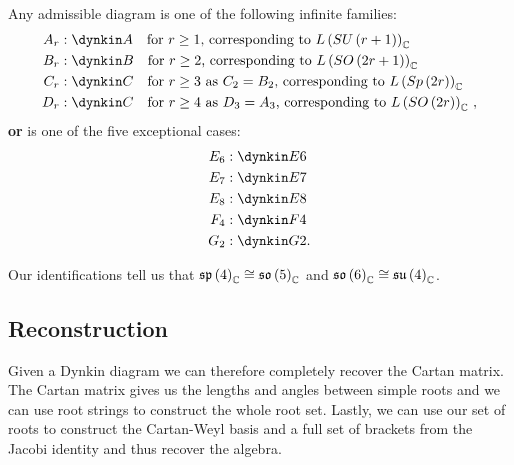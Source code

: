 \begin{theorem}
    Any admissible diagram is one of the following infinite families:
    \begin{align}
        A_r &: \dynkin A{} \quad \text{for $r \geq 1$, corresponding to $L \left( SU \left( r + 1 \right)  \right)_{\C}$} \\
        B_r &: \dynkin B{} \quad \text{for $r \geq 2$, corresponding to $L \left( SO \left( 2r + 1 \right)  \right)_{\C}$} \\
        C_r &: \dynkin C{}\quad \text{for $r \geq 3$ as $C_2 = B_2$, corresponding to $L \left( Sp \left( 2r  \right)  \right)_{\C}$ } \\
        D_r &: \dynkin C{}\quad \text{for $r \geq 4$ as $D_3 = A_3$, corresponding to $L \left( SO \left( 2r  \right)  \right)_{\C}$  }
    ,\end{align}
    \textbf{or} is one of the five exceptional cases: 
    \begin{align}
        E_6 &: \dynkin E6 \\
        E_7 &: \dynkin E7 \\
        E_8 &: \dynkin E8 \\
        F_4 &: \dynkin F4 \\
        G_2 &: \dynkin G2 
    .\end{align}
\end{theorem}

Our identifications tell us that $\mathfrak{sp}\left( 4 \right)_{\mathbb{C}} \cong \mathfrak{so}\left( 5 \right)_{\mathbb{C}}$ and $\mathfrak{so}\left( 6 \right)_{\mathbb{C}} \cong \mathfrak{su}\left( 4 \right)_{\mathbb{C}}$.

\subsection{Reconstruction}

Given a Dynkin diagram we can therefore completely recover the Cartan matrix. The Cartan matrix gives us the lengths and angles between simple roots and we can use root strings to construct the whole root set. Lastly, we can use our set of roots to construct the Cartan-Weyl basis and a full set of brackets from the Jacobi identity and thus recover the algebra.


